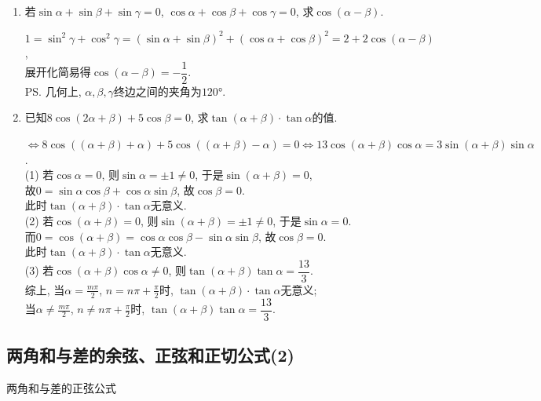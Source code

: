 \begin{enumerate}
\item 若$\sin\alpha+\sin\beta+\sin\gamma=0$, $\cos\alpha+\cos\beta+\cos\gamma=0$, 求$\cos(\alpha-\beta)$. 
\begin{jieda}
$1=\sin^2\gamma+\cos^2\gamma=(\sin\alpha+\sin\beta)^2+(\cos\alpha+\cos\beta)^2=2+2\cos(\alpha-\beta)$, \\
展开化简易得$\cos(\alpha-\beta)=-\dfrac{1}{2}$. \\
\ps 几何上, $\alpha,\beta,\gamma$终边之间的夹角为$\ang{120}$. 
\end{jieda}

\item 已知$8\cos(2\alpha+\beta)+5\cos\beta=0$, 求$\tan(\alpha+\beta)\cdot\tan\alpha$的值. 
\begin{jieda}
$\iff 8\cos((\alpha+\beta)+\alpha)+5\cos((\alpha+\beta)-\alpha)=0\iff 13\cos(\alpha+\beta)\cos\alpha=3\sin(\alpha+\beta)\sin\alpha$. \\
(1) 若$\cos\alpha=0$, 则$\sin\alpha=\pm1\neq 0$, 于是$\sin(\alpha+\beta)=0$, \\
故$0=\sin\alpha\cos\beta+\cos\alpha\sin\beta$, 故$\cos\beta=0$. \\
此时$\tan(\alpha+\beta)\cdot\tan\alpha$无意义. \\
(2) 若$\cos(\alpha+\beta)=0$, 则$\sin(\alpha+\beta)=\pm1\neq0$, 于是$\sin\alpha=0$. \\
而$0=\cos(\alpha+\beta)=\cos\alpha\cos\beta-\sin\alpha\sin\beta$, 故$\cos\beta=0$. \\
此时$\tan(\alpha+\beta)\cdot\tan\alpha$无意义. \\
(3) 若$\cos(\alpha+\beta)\cos\alpha\neq 0$, 则$\tan(\alpha+\beta)\tan\alpha=\dfrac{13}{3}$. \\
综上, 当$\alpha=\frac{m\pi}{2}$, $n=n\pi+\frac{\pi}{2}$时, $\tan(\alpha+\beta)\cdot\tan\alpha$无意义; \\
当$\alpha\neq\frac{m\pi}{2}$, $n\neq n\pi+\frac{\pi}{2}$时, $\tan(\alpha+\beta)\tan\alpha=\dfrac{13}{3}$. 
\end{jieda}

\end{enumerate}







\subsection{两角和与差的余弦、正弦和正切公式(2)}
\zsd 两角和与差的正弦公式


